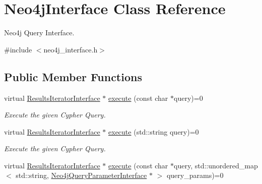 \hypertarget{classNeo4jInterface}{\section{Neo4j\-Interface Class Reference}
\label{classNeo4jInterface}
}


Neo4j Query Interface.  




{\ttfamily \#include $<$neo4j\-\_\-interface.\-h$>$}

\subsection*{Public Member Functions}
\begin{DoxyCompactItemize}
\item 
\hypertarget{classNeo4jInterface_a93992c994fc63856a1952d304f5030c3}{virtual \hyperlink{classResultsIteratorInterface}{Results\-Iterator\-Interface} $\ast$ \hyperlink{classNeo4jInterface_a93992c994fc63856a1952d304f5030c3}{execute} (const char $\ast$query)=0}\label{classNeo4jInterface_a93992c994fc63856a1952d304f5030c3}

\begin{DoxyCompactList}\small\item\em Execute the given Cypher Query. \end{DoxyCompactList}\item 
\hypertarget{classNeo4jInterface_a25908b6389132c27fdd0f93b2fed749f}{virtual \hyperlink{classResultsIteratorInterface}{Results\-Iterator\-Interface} $\ast$ \hyperlink{classNeo4jInterface_a25908b6389132c27fdd0f93b2fed749f}{execute} (std\-::string query)=0}\label{classNeo4jInterface_a25908b6389132c27fdd0f93b2fed749f}

\begin{DoxyCompactList}\small\item\em Execute the given Cypher Query. \end{DoxyCompactList}\item 
\hypertarget{classNeo4jInterface_abe7b55b502699a1d7681ef0a90626cdb}{virtual \hyperlink{classResultsIteratorInterface}{Results\-Iterator\-Interface} $\ast$ \hyperlink{classNeo4jInterface_abe7b55b502699a1d7681ef0a90626cdb}{execute} (const char $\ast$query, std\-::unordered\-\_\-map$<$ std\-::string, \hyperlink{classNeo4jQueryParameterInterface}{Neo4j\-Query\-Parameter\-Interface} $\ast$ $>$ query\-\_\-params)=0}\label{classNeo4jInterface_abe7b55b502699a1d7681ef0a90626cdb}


\end{DoxyCompactItemize}
